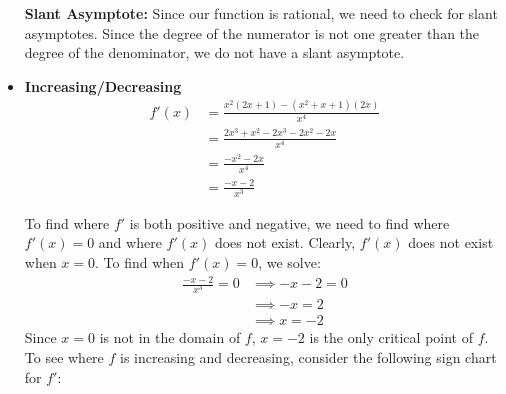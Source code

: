 \documentclass[handout,nooutcomes]{ximera}
\renewenvironment{freeResponse}{
\ifhandout\setbox0\vbox\bgroup\else
\begin{trivlist}\item[\hskip \labelsep\bfseries Solution:\hspace{2ex}]
\fi}
{\ifhandout\egroup\else
\end{trivlist}
\fi}
\newcommand{\dfn}{\textbf}
\begin{document}
\begin{problem}
\begin{freeResponse}
\begin{itemize}
       \dfn{Slant Asymptote:}  Since our function is rational, we need to check for slant asymptotes.
       Since the degree of the numerator is not one greater than the degree of the denominator, we do not have a slant asymptote.
			
     \item
       \dfn{Increasing/Decreasing}  \\

       \begin{align*}
         f'(x) &= \frac{x^2(2x+1) - (x^2+x+1)(2x)}{x^4} \\
               &= \frac{2x^3 + x^2 - 2x^3 - 2x^2 - 2x}{x^4} \\
               &= \frac{-x^2 - 2x}{x^4} \\
               &= \frac{-x-2}{x^3}
       \end{align*}
			
       To find where $f'$ is both positive and negative, we need to find where $f'(x) = 0$ and where $f'(x)$ does not exist.
       Clearly, $f'(x)$ does not exist when $x=0$.
       To find when $f'(x) = 0$, we solve:
       \begin{align*}
         \frac{-x-2}{x^3} = 0 &\implies -x-2 = 0 \\
         &\implies -x = 2\\
         &\implies x = -2
       \end{align*}
       Since $x=0$ is not in the domain of $f$, $x=-2$ is the only critical point of $f$.
       To see where $f$ is increasing and decreasing, consider the following sign chart for $f'$:
       \begin{center}
         \begin{image}
         \end{image}
       \end{center}


\end{itemize}
\end{freeResponse}
\end{problem}
\end{document}

